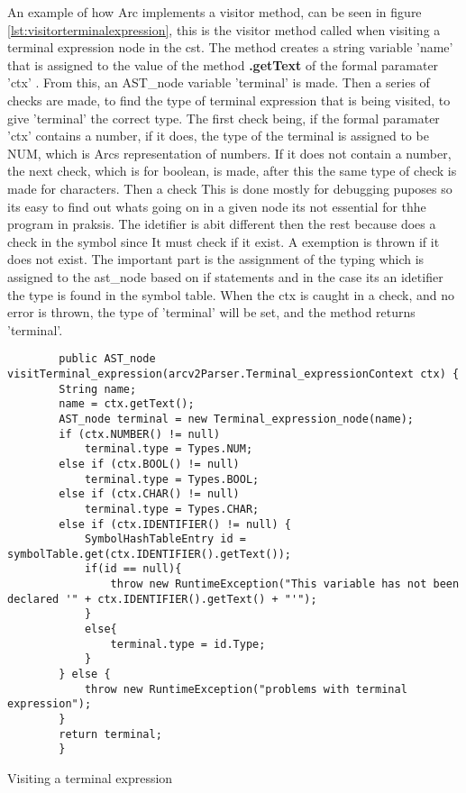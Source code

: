 An example of how Arc implements a visitor method, can be seen in figure \ref{lst:visitorterminalexpression}, this is the visitor method called when visiting a terminal expression node in the \gls{cst}. The method creates a string variable 'name' that is assigned to the value of the method \textbf{.getText} of the formal paramater 'ctx' . From this, an AST\_node variable 'terminal' is made. Then a series of checks are made, to find the type of terminal expression that is being visited, to give 'terminal' the correct type. The first check being, if the formal paramater 'ctx' contains a number, if it does, the type of the terminal is assigned to be NUM, which is Arcs representation of numbers. If it does not contain a number, the next check, which is for boolean, is made, after this the same type of check is made for characters. Then a check This is done mostly for debugging puposes so its easy to find out whats going on in a given node its not essential for thhe program in praksis. The idetifier is abit different then the rest because does a check in the symbol since It must check if it exist. A exemption is thrown if it does not exist. The important part is the assignment of the typing which is assigned to the ast_node based on if statements and in the case its an idetifier the type is found in the symbol table. When the ctx is caught in a check, and no error is thrown, the type of 'terminal' will be set, and the method returns 'terminal'.


\begin{listing}[htb!]
    \begin{verbatim}
        public AST_node visitTerminal_expression(arcv2Parser.Terminal_expressionContext ctx) {
        String name;
        name = ctx.getText();
        AST_node terminal = new Terminal_expression_node(name);
        if (ctx.NUMBER() != null)
            terminal.type = Types.NUM;
        else if (ctx.BOOL() != null)
            terminal.type = Types.BOOL;
        else if (ctx.CHAR() != null)
            terminal.type = Types.CHAR;
        else if (ctx.IDENTIFIER() != null) {
            SymbolHashTableEntry id = symbolTable.get(ctx.IDENTIFIER().getText());
            if(id == null){
                throw new RuntimeException("This variable has not been declared '" + ctx.IDENTIFIER().getText() + "'");
            }
            else{
                terminal.type = id.Type;
            }
        } else {
            throw new RuntimeException("problems with terminal expression");
        }
        return terminal;
        }
    \end{verbatim}
    \caption{Visiting a terminal expression}
    \label{lst:visitorterminalexpression}
\end{listing}


